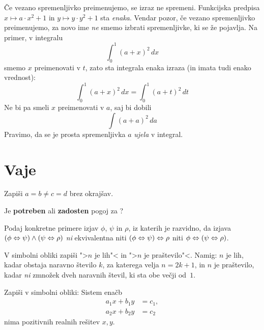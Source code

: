 Če vezano spremenljivko preimenujemo, se izraz ne spremeni. Funkcijska predpisa $x \mapsto a \cdot x^2 + 1$ in $y \mapsto y \cdot y^2 + 1$ sta \emph{enaka}. Vendar pozor, če vezano spremenljivko preimenujemo, za novo ime \emph{ne} smemo izbrati spremenljivke, ki se že pojavlja. Na primer, v integralu
%
\begin{equation*}
  \int_0^1 (a + x)^2 \, d x
\end{equation*}
%
smemo $x$ preimenovati v $t$, zato sta integrala enaka izraza (in imata tudi enako vrednost):
%
\begin{equation*}
  \int_0^1 (a + x)^2 \, d x  = \int_0^1 (a + t)^2 \, d t
\end{equation*}
%
Ne bi pa smeli $x$ preimenovati v $a$, saj bi dobili
%
\begin{equation*}
  \int (a + a)^2 \, d a
\end{equation*}
%
Pravimo, da se je prosta spremenljivka $a$ \emph{ujela} v integral.

\section{Vaje}

\begin{vaja}
  Zapiši $a = b \neq c = d$ brez okrajšav.
\end{vaja}

\begin{vaja}
  Je  \textbf{potreben} ali \textbf{zadosten}
  pogoj za ?
\end{vaja}

\begin{vaja}
  Podaj konkretne primere izjav $\phi$, $\psi$ in $\rho$, iz katerih
  je razvidno, da izjava $(\phi \Leftrightarrow \psi) \land (\psi \Leftrightarrow \rho)$
  \emph{ni} ekvivalentna niti $(\phi \Leftrightarrow \psi) \Leftrightarrow \rho$ niti
  $\phi \Leftrightarrow (\psi \Leftrightarrow \rho)$.
\end{vaja}

\begin{vaja}
  V simbolni obliki zapiši ">$n$ je lih"< in ">$n$ je praštevilo"<.
  Namig: $n$ je lih, kadar obstaja naravno število $k$, za katerega
  velja $n = 2 k + 1$, in $n$ je praštevilo, kadar \emph{ni} zmnožek
  dveh naravnih števil, ki sta obe večji od~$1$.
\end{vaja}

\begin{vaja}
  Zapiši v simbolni obliki: Sistem enačb
  \begin{align*}
    a_1 x + b_1 y &= c_1,\\
    a_2 x + b_2 y &= c_2
  \end{align*}
  nima pozitivnih realnih rešitev $x, y$.
\end{vaja}

